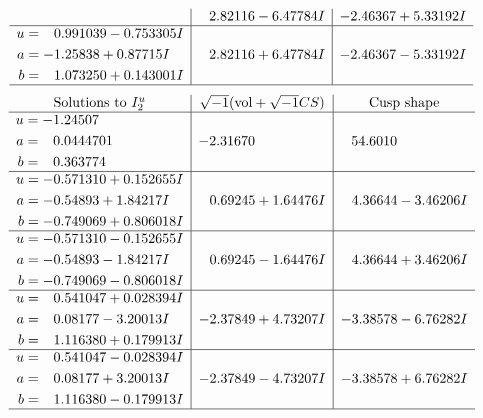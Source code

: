 \documentclass[1p]{elsarticle_modified}
\theoremstyle{definition}
\newcommand{\I}{\sqrt{-1}}
\begin{document}
$$\begin{array}{c|c|c}
 & \phantom{-}2.82116 - 6.47784 I & -2.46367 + 5.33192 I \\ \hline\begin{aligned}
u &= \phantom{-}0.991039 - 0.753305 I \\
a &= -1.25838 + 0.87715 I \\
b &= \phantom{-}1.073250 + 0.143001 I\end{aligned}
 & \phantom{-}2.82116 + 6.47784 I & -2.46367 - 5.33192 I\\
 \hline 
 \end{array}$$\newpage$$\begin{array}{c|c|c}  
\text{Solutions to }I^u_{2}& \I (\text{vol} + \sqrt{-1}CS) & \text{Cusp shape}\\
 \hline 
\begin{aligned}
u &= -1.24507\phantom{ +0.000000I} \\
a &= \phantom{-}0.0444701\phantom{ +0.000000I} \\
b &= \phantom{-}0.363774\phantom{ +0.000000I}\end{aligned}
 & -2.31670\phantom{ +0.000000I} & \phantom{-}54.6010\phantom{ +0.000000I} \\ \hline\begin{aligned}
u &= -0.571310 + 0.152655 I \\
a &= -0.54893 + 1.84217 I \\
b &= -0.749069 + 0.806018 I\end{aligned}
 & \phantom{-}0.69245 + 1.64476 I & \phantom{-}4.36644 - 3.46206 I \\ \hline\begin{aligned}
u &= -0.571310 - 0.152655 I \\
a &= -0.54893 - 1.84217 I \\
b &= -0.749069 - 0.806018 I\end{aligned}
 & \phantom{-}0.69245 - 1.64476 I & \phantom{-}4.36644 + 3.46206 I \\ \hline\begin{aligned}
u &= \phantom{-}0.541047 + 0.028394 I \\
a &= \phantom{-}0.08177 - 3.20013 I \\
b &= \phantom{-}1.116380 + 0.179913 I\end{aligned}
 & -2.37849 + 4.73207 I & -3.38578 - 6.76282 I \\ \hline\begin{aligned}
u &= \phantom{-}0.541047 - 0.028394 I \\
a &= \phantom{-}0.08177 + 3.20013 I \\
b &= \phantom{-}1.116380 - 0.179913 I\end{aligned}
 & -2.37849 - 4.73207 I & -3.38578 + 6.76282 I\\
 \hline 
 \end{array}$$\newpage
\end{document}
